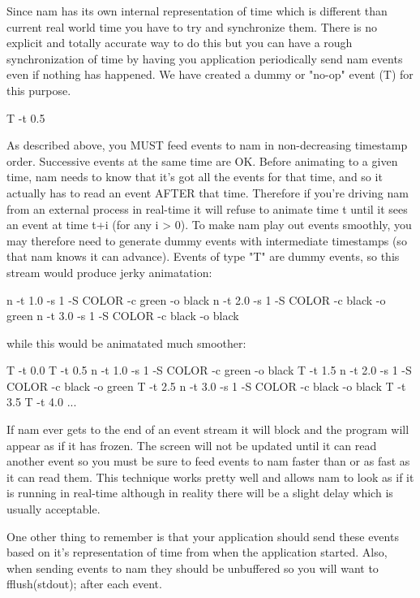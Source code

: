 Since nam has its own internal representation of time which is different
than current real world time you have to try and synchronize them.
There is no explicit and totally accurate way to do this but you can
have a rough synchronization of time by having you application
periodically send nam events even if nothing has happened. We have 
created a dummy or "no-op" event (T) for this purpose.
\begin{program}
T -t 0.5
\end{program}

As described above, you MUST feed events to nam in non-decreasing
timestamp order. Successive events at the same time are OK. 
Before animating to a given time, nam needs to know that it's got all
the events for that time, and so it actually has to read an event
AFTER that time.  Therefore if you're driving nam from an external
process in real-time it will refuse to animate time t until it sees an
event at time t+i (for any i > 0).  To make nam play out events
smoothly, you may therefore need to generate dummy events with
intermediate timestamps (so that nam knows it can advance).  Events of
type "T" are dummy events, so this stream would produce jerky
animatation:

\begin{program}
n -t 1.0 -s 1 -S COLOR -c green -o black
n -t 2.0 -s 1 -S COLOR -c black -o green
n -t 3.0 -s 1 -S COLOR -c black -o black
\end{program}

while this would be animatated much smoother:

\begin{program}
T -t 0.0
T -t 0.5
n -t 1.0 -s 1 -S COLOR -c green -o black
T -t 1.5
n -t 2.0 -s 1 -S COLOR -c black -o green
T -t 2.5
n -t 3.0 -s 1 -S COLOR -c black -o black
T -t 3.5
T -t 4.0
...
\end{program}

If nam ever gets to the end of an
event stream it will block and the program will appear as if it
has frozen.  The screen will not be updated until it can read another event
so you must be sure to feed events to nam faster than or as fast as it
can read them.  This technique works pretty well and allows nam to look
as if it is running in real-time although in reality there will be a
slight delay which is usually acceptable.

One other thing to remember is that your application should send these events
based on it's representation of time from when the application started.
Also, when sending events to nam they should be unbuffered so you 
will want to fflush(stdout); after each event.

